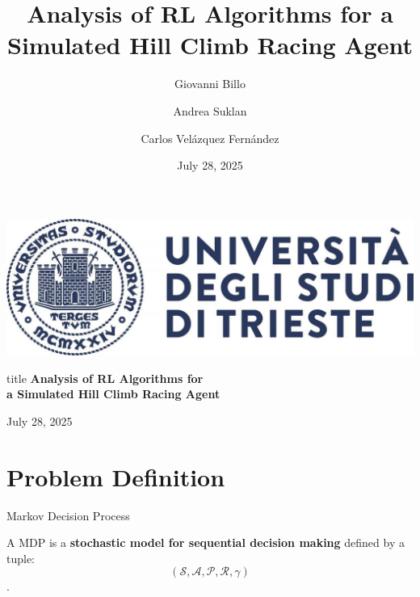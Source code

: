 \documentclass[serif]{beamer}  %
\author{
    Giovanni Billo
    \and  
    Andrea Suklan
    \and  
    Carlos Velázquez Fernández
}
\title{Analysis of RL Algorithms for a Simulated Hill Climb Racing Agent}
\date{\small July 28, 2025}
\begin{document}
\begin{frame}
    \vfill
    \begin{center}
        \includegraphics[keepaspectratio, scale=0.15]{images/logo.jpg}
        
        \vspace{1cm}
        
        \begin{beamercolorbox}[wd=\textwidth,center,rounded=true]{title}
            {\textbf{Analysis of RL Algorithms for \\ a Simulated Hill Climb Racing Agent}}
        \end{beamercolorbox}
        
        \vspace{1cm}
        
        {July 28, 2025}
    \end{center}
    \vfill
\end{frame} 

\begin{frame}    
\tableofcontents[sectionstyle=show,
subsectionstyle=show/shaded/hide,
subsubsectionstyle=show/shaded/hide]
\end{frame}



\section{Problem Definition}

    \begin{frame}{Markov Decision Process}

    A MDP is a \textbf{stochastic model for sequential decision making} defined by a tuple: $$(\mathcal{S}, \mathcal{A}, \mathcal{P}, \mathcal{R}, \gamma)$$.
        
    \end{frame}
\end{document}
